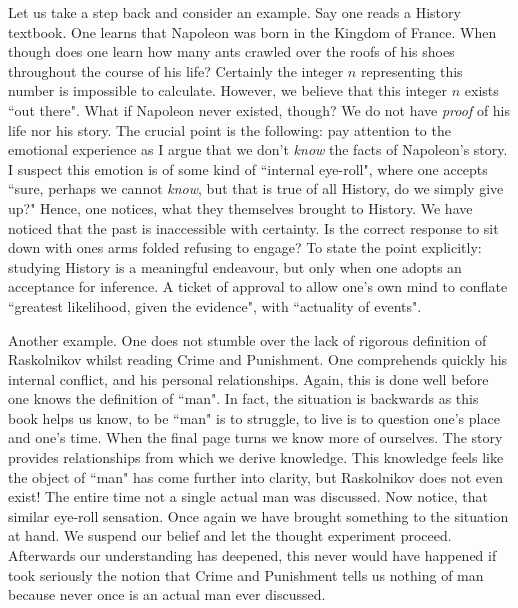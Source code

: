 \documentclass[12pt]{article}
\theoremstyle{plain}
\theoremstyle{definition}
\begin{document}
	Let us take a step back and consider an example. Say one reads a History textbook. One learns that Napoleon was born in the Kingdom of France. When though does one learn how many ants crawled over the roofs of his shoes throughout the course of his life? Certainly the integer $n$ representing this number is impossible to calculate. However, we believe that this integer $n$ exists ``out there". What if Napoleon never existed, though? We do not have \emph{proof} of his life nor his story. The crucial point is the following: pay attention to the emotional experience as I argue that we don't \emph{know} the facts of Napoleon's story. I suspect this emotion is of some kind of ``internal eye-roll", where one accepts ``sure, perhaps we cannot \emph{know}, but that is true of all History, do we simply give up?" Hence, one notices, what they themselves brought to History. We have noticed that the past is inaccessible with certainty. Is the correct response to sit down with ones arms folded refusing to engage? To state the point explicitly: studying History is a meaningful endeavour, but only when one adopts an acceptance for inference.  A ticket of approval to allow one's own mind to conflate ``greatest likelihood, given the evidence", with ``actuality of events".
	
	Another example. One does not stumble over the lack of rigorous definition of Raskolnikov whilst reading Crime and Punishment. One comprehends quickly his internal conflict, and his personal relationships. Again, this is done well before one knows the definition of ``man". In fact, the situation is backwards as this book helps us know, to be ``man" is to struggle, to live is to question one's place and one's time. When the final page turns we know more of ourselves. The story provides relationships from which we derive knowledge. This knowledge feels like the object of ``man" has come further into clarity, but Raskolnikov does not even exist! The entire time not a single actual man was discussed. Now notice, that similar eye-roll sensation. Once again we have brought something to the situation at hand. We suspend our belief and let the thought experiment proceed. Afterwards our understanding has deepened, this never would have happened if took seriously the notion that Crime and Punishment tells us nothing of man because never once is an actual man ever discussed.
	
\end{document}

